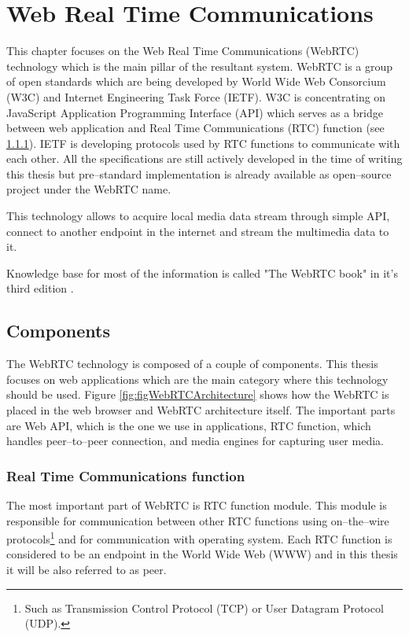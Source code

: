 % 
\chapter{Web Real Time Communications}
\label{chap:chapter2}
This chapter focuses on the Web Real Time Communications (WebRTC) technology which is the main pillar of the resultant system. WebRTC is a group of open standards which are being developed by World Wide Web Consorcium (W3C) and Internet Engineering Task Force (IETF). W3C is concentrating on JavaScript Application Programming Interface (API) which serves as a bridge between web application and Real Time Communications (RTC) function (see \ref{sec:rtc-function}). IETF is developing protocols used by RTC functions to communicate with each other. All the specifications are still actively developed in the time of writing this thesis but pre--standard implementation is already available as open--source project under the WebRTC name.

This technology allows to acquire local media data stream through simple API, connect to another endpoint in the internet and stream the multimedia data to it.

Knowledge base for most of the information is called "The WebRTC book" in it's third edition \cite{TheWebRTCBook}.




\section{Components}
The WebRTC technology is composed of a couple of components. This thesis focuses on web applications which are the main category where this technology should be used. Figure \ref{fig:figWebRTCArchitecture} shows how the WebRTC is placed in the web browser and WebRTC architecture itself. The important parts are Web API, which is the one we use in applications, RTC function, which handles peer--to--peer connection, and media engines for capturing user media.




\subsection{Real Time Communications function}
\label{sec:rtc-function}
The most important part of WebRTC is RTC function module. This module is responsible for communication between other RTC functions using on--the--wire protocols\footnote{Such as Transmission Control Protocol (TCP) or User Datagram Protocol (UDP).} and for communication with operating system. Each RTC function is considered to be an endpoint in the World Wide Web (WWW) and in this thesis it will be also referred to as peer.


